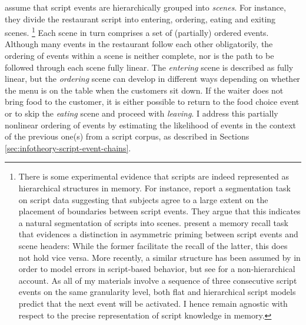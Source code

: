 \citet{schank.abelson1977} assume that script events are hierarchically grouped into \textit{scenes}. For instance, they divide the restaurant script into entering, ordering, eating and exiting scenes.%
%
\footnote{There is some experimental evidence that scripts are indeed represented as hierarchical structures in memory. For instance, \citet{bower.etal1979} report a segmentation task on script data suggesting that subjects agree to a large extent on the placement of boundaries between script events. They argue that this indicates a natural segmentation of scripts into scenes. \citet{abbott.etal1985} present a memory recall task that evidences a distinction in asymmetric priming between script events and scene headers: While the former facilitate the recall of the latter, this does not hold vice versa. More recently, a similar structure has been assumed by \citet{cooper.shallice2000} in order to model errors in script-based behavior, but see \citet{botvinick.plaut2004} for a non-hierarchical account. As all of my materials involve a sequence of three consecutive script events on the same granularity level, both flat and hierarchical script models predict that the next event will be activated. I hence remain agnostic with respect to the precise representation of script knowledge in memory.}\afterfn%
%
Each scene in turn comprises a set of (partially) ordered events. Although many events in the restaurant follow each other obligatorily, the ordering of events within a scene is neither complete, nor is the path to be followed through each scene fully linear. The \textit{entering} scene is described as fully linear, but the \textit{ordering} scene can develop in different ways depending on whether the menu is on the table when the customers sit down. If the waiter does not bring food to the customer, it is either possible to return to the food choice event or to skip the \textit{eating} scene and proceed with \textit{leaving}. I address this partially nonlinear ordering of events by estimating the likelihood of events in the context of the previous one(s) from a script corpus, as described in Sections \ref{sec:infotheory-script-event-chains}.


